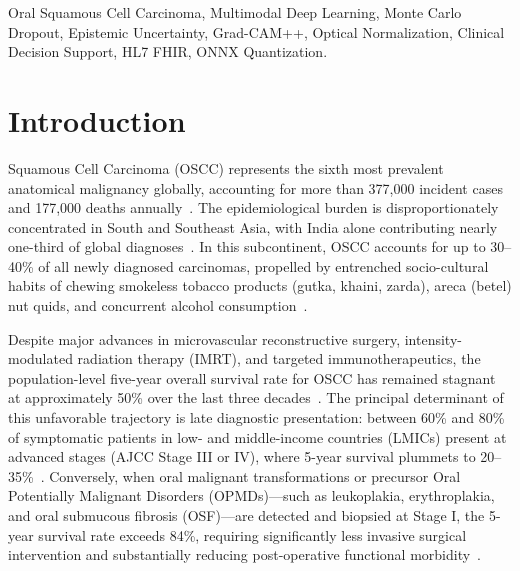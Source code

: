 \documentclass[journal]{IEEEtran}
\begin{document}
\begin{IEEEkeywords}
Oral Squamous Cell Carcinoma, Multimodal Deep Learning, Monte Carlo Dropout, Epistemic Uncertainty, Grad-CAM++, Optical Normalization, Clinical Decision Support, HL7 FHIR, ONNX Quantization.
\end{IEEEkeywords}

\section{Introduction}
 Squamous Cell Carcinoma (OSCC) represents the sixth most prevalent anatomical malignancy globally, accounting for more than 377,000 incident cases and 177,000 deaths annually~\cite{sung2021globocan, bray2024globocan}. The epidemiological burden is disproportionately concentrated in South and Southeast Asia, with India alone contributing nearly one-third of global diagnoses~\cite{gupta2004epidemiology}. In this subcontinent, OSCC accounts for up to 30--40\% of all newly diagnosed carcinomas, propelled by entrenched socio-cultural habits of chewing smokeless tobacco products (gutka, khaini, zarda), areca (betel) nut quids, and concurrent alcohol consumption~\cite{johnson2020head}.

Despite major advances in microvascular reconstructive surgery, intensity-modulated radiation therapy (IMRT), and targeted immunotherapeutics, the population-level five-year overall survival rate for OSCC has remained stagnant at approximately 50\% over the last three decades~\cite{amin2017ajcc}. The principal determinant of this unfavorable trajectory is late diagnostic presentation: between 60\% and 80\% of symptomatic patients in low- and middle-income countries (LMICs) present at advanced stages (AJCC Stage III or IV), where 5-year survival plummets to 20--35\%~\cite{warnakulasuriya2021opmd}. Conversely, when oral malignant transformations or precursor Oral Potentially Malignant Disorders (OPMDs)---such as leukoplakia, erythroplakia, and oral submucous fibrosis (OSF)---are detected and biopsied at Stage I, the 5-year survival rate exceeds 84\%, requiring significantly less invasive surgical intervention and substantially reducing post-operative functional morbidity~\cite{vanderwaal2020screening}.
\end{document}
